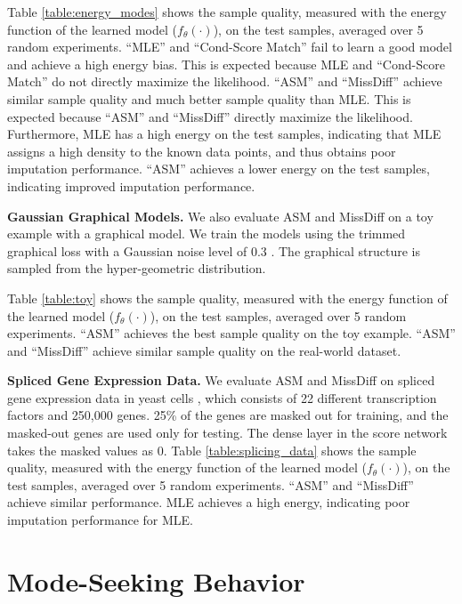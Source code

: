 Table \ref{table:energy_modes} shows the sample quality, measured with the energy function of the learned model ($f_{\theta}(\cdot)$), on the test samples, averaged over 5 random experiments. ``MLE'' and ``Cond-Score Match'' fail to learn a good model and achieve a high energy bias. This is expected because MLE and ``Cond-Score Match'' do not directly maximize the likelihood. ``ASM'' and ``MissDiff'' achieve similar sample quality and much better sample quality than MLE. This is expected because ``ASM'' and ``MissDiff'' directly maximize the likelihood. Furthermore, MLE has a high energy on the test samples, indicating that MLE assigns a high density to the known data points, and thus obtains poor imputation performance. ``ASM'' achieves a lower energy on the test samples, indicating improved imputation performance.


\textbf{Gaussian Graphical Models.} We also evaluate ASM and MissDiff on a toy example with a graphical model. We train the models using the trimmed graphical loss with a Gaussian noise level of 0.3 \citep{Yang2015}. The graphical structure is sampled from the hyper-geometric distribution.

Table \ref{table:toy} shows the sample quality, measured with the energy function of the learned model ($f_{\theta}(\cdot)$), on the test samples, averaged over 5 random experiments. ``ASM'' achieves the best sample quality on the toy example. ``ASM'' and ``MissDiff'' achieve similar sample quality on the real-world dataset.

\textbf{Spliced Gene Expression Data.}
We evaluate ASM and MissDiff on spliced gene expression data in yeast cells \citep{Brem2005}, which consists of 22 different transcription factors and 250,000 genes. 25\% of the genes are masked out for training, and the masked-out genes are used only for testing. The dense layer in the score network takes the masked values as $0$. Table \ref{table:splicing_data} shows the sample quality, measured with the energy function of the learned model ($f_{\theta}(\cdot)$), on the test samples, averaged over 5 random experiments. ``ASM'' and ``MissDiff'' achieve similar performance. MLE achieves a high energy, indicating poor imputation performance for MLE.


\section{Mode-Seeking Behavior}

